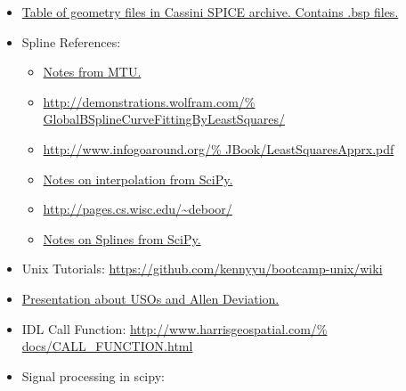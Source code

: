 \documentclass[crop=false,class=article,oneside]{standalone}
\begin{document}
\begin{itemize}[itemsep=0pt]
{                            ec48ec4cae25_story.html?utm_term%
                            =.4aad5c52355d}{Article about Cassini.}
                \item \href{https://naif.jpl.nasa.gov/pub/%
                            naif/pds/data/co-s_j_e_v-spice-6-v1.0/%
                            cosp_1000/data/pck/pckinfo.txt}
                           {Table of geometry files in Cassini
                            SPICE archive. Contains .bsp files.}
                \item Spline References:
                \begin{itemize}
                    \item \href{http://www.cs.mtu.edu/%
                                ~shene/COURSES/cs3621/NOTES/%
                                INT-APP/CURVE-APP-global.html}
                               {Notes from MTU.}
                    \item \url{http://demonstrations.wolfram.com/%
                               GlobalBSplineCurveFittingByLeastSquares/}
                    \item \url{http://www.infogoaround.org/%
                               JBook/LeastSquaresApprx.pdf}
                    \item \href{https://docs.scipy.org/doc/%
                                scipy-0.15.1/reference/generated/%
                                scipy.interpolate.splrep.html}
                               {Notes on interpolation from SciPy.}
                    \item \url{http://pages.cs.wisc.edu/~deboor/}
                    \item \href{https://docs.scipy.org/doc/%
                                scipy/reference/generated/%
                                scipy.interpolate.splrep.html}
                               {Notes on Splines from SciPy.}
                \end{itemize}
                \item Unix Tutorials:
                    \url{https://github.com/kennyyu/bootcamp-unix/wiki}
                \item \href{https://websites.isae-supaero.fr/%
                            IMG/pdf/uso-toulouse.pdf}
                           {Presentation about USOs and Allen Deviation.}
                \item IDL Call Function:
                      \url{http://www.harrisgeospatial.com/%
                           docs/CALL_FUNCTION.html}
                \item Signal processing in scipy:

\end{itemize}
\end{document}
